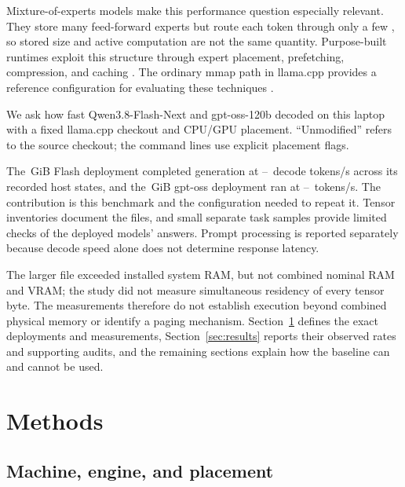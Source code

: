 \documentclass[11pt]{article}
\begin{document}
Mixture-of-experts models make this performance question especially relevant.
They store many feed-forward experts but route each token through only a few
\citep{shazeer2017moe,fedus2021switch,dai2024deepseekmoe}, so stored size and
active computation are not the same quantity. Purpose-built runtimes exploit
this structure through expert placement, prefetching, compression, and caching
\citep{edgemoe2023,mixtraloffload2023,hobbit2024,slicemoe2025,dymoe2026,
pagedweight2026}. The ordinary mmap path in llama.cpp provides a reference
configuration for evaluating these techniques \citep{gerganov2023llamacpp}.

We ask how fast Qwen3.8-Flash-Next and gpt-oss-120b decoded on this laptop
with a fixed llama.cpp checkout and CPU/GPU placement. ``Unmodified'' refers
to the source checkout; the command lines use explicit placement flags.

The \PthreeFlashFileGiB\,GiB Flash deployment completed generation at
\PthreeFlashInitialGenOne--\PthreeFlashQuietGenOne\ decode tokens/s across its
recorded host states, and the \PthreeGptOssFileGiB\,GiB gpt-oss deployment ran
at \PthreeGptOssInitialGenTwo--\PthreeGptOssInitialGenOne\ tokens/s. The
contribution is this benchmark and the configuration needed to repeat it.
Tensor inventories document the files, and small separate task samples
provide limited checks of the deployed models' answers. Prompt processing is
reported separately because decode speed alone does not determine response
latency.

The larger file exceeded installed system RAM, but not combined nominal RAM
and VRAM; the study did not measure simultaneous residency of every tensor
byte. The measurements therefore do not establish execution beyond combined
physical memory or identify a paging mechanism.
Section~\ref{sec:methods} defines the exact deployments and measurements,
Section~\ref{sec:results} reports their observed rates and supporting audits,
and the remaining sections explain how the baseline can and cannot be used.

\section{Methods}
\label{sec:methods}

\subsection{Machine, engine, and placement}
\end{document}
